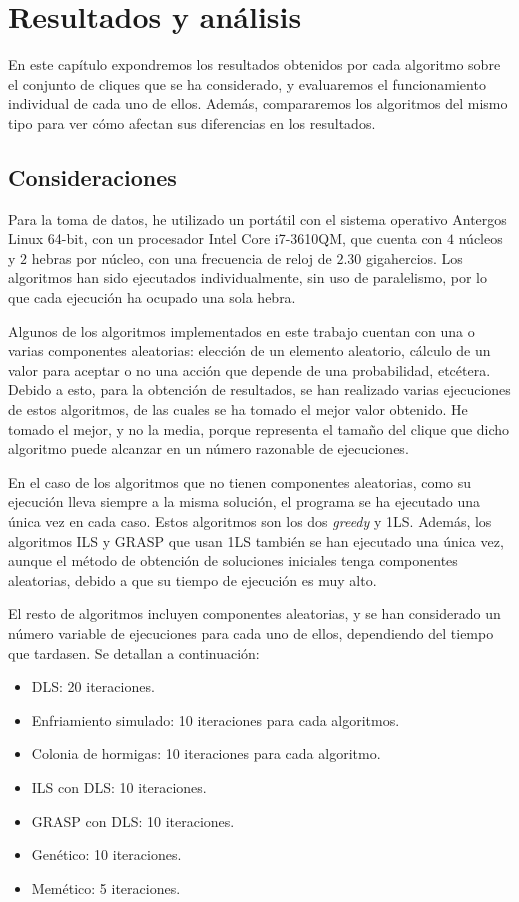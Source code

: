 \chapter{Resultados y análisis}\label{ch:resultados}

En este capítulo expondremos los resultados obtenidos por cada algoritmo sobre el
conjunto de cliques que se ha considerado, y evaluaremos el funcionamiento individual
de cada uno de ellos. Además, compararemos los algoritmos del mismo tipo para ver cómo
afectan sus diferencias en los resultados.

\section{Consideraciones}

Para la toma de datos, he utilizado un portátil con el sistema operativo Antergos
Linux 64-bit, con un procesador Intel Core i7-3610QM, que cuenta con $4$ núcleos
y $2$ hebras por núcleo, con una frecuencia de reloj de $2.30$ gigahercios. Los
algoritmos han sido ejecutados individualmente, sin uso de paralelismo, por lo que
cada ejecución ha ocupado una sola hebra.

Algunos de los algoritmos implementados en este trabajo cuentan con una o varias
componentes aleatorias: elección de un elemento aleatorio, cálculo de un valor para
aceptar o no una acción que depende de una probabilidad, etcétera. Debido a esto,
para la obtención de resultados, se han realizado varias ejecuciones de estos algoritmos,
de las cuales se ha tomado el mejor valor obtenido. He tomado el mejor, y no la media,
porque representa el tamaño del clique que dicho algoritmo puede alcanzar en un
número razonable de ejecuciones.

En el caso de los algoritmos que no tienen componentes aleatorias, como su ejecución
lleva siempre a la misma solución, el programa se ha ejecutado una única vez en
cada caso. Estos algoritmos son los dos \textit{greedy} y 1LS. Además, los algoritmos
ILS y GRASP que usan 1LS también se han ejecutado una única vez, aunque el método
de obtención de soluciones iniciales tenga componentes aleatorias, debido a que su
tiempo de ejecución es muy alto.

El resto de algoritmos incluyen componentes aleatorias, y se han considerado un
número variable de ejecuciones para cada uno de ellos, dependiendo del tiempo que
tardasen. Se detallan a continuación:
\begin{itemize}
  \item DLS: 20 iteraciones.
  \item Enfriamiento simulado: 10 iteraciones para cada algoritmos.
  \item Colonia de hormigas: 10 iteraciones para cada algoritmo.
  \item ILS con DLS: 10 iteraciones.
  \item GRASP con DLS: 10 iteraciones.
  \item Genético: 10 iteraciones.
  \item Memético: 5 iteraciones.
\end{itemize}

